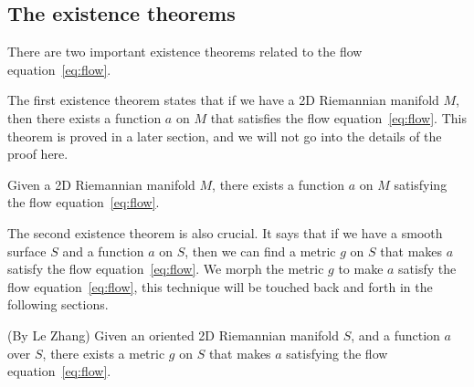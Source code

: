\subsection{The existence theorems}\label{subsec:existence-theorems}

There are two important existence theorems related to the flow equation~\eqref{eq:flow}.

The first existence theorem states that if we have a 2D Riemannian manifold $M$, then there exists a function $a$ on $M$ that satisfies the flow equation~\eqref{eq:flow}. This theorem is proved in a later section, and we will not go into the details of the proof here.

\begin{theorem}
    Given a 2D Riemannian manifold $M$, there exists a function $a$ on $M$ satisfying the flow equation~\eqref{eq:flow}.
    \label{prop:existence1st}
\end{theorem}

The second existence theorem is also crucial.
It says that if we have a smooth surface $S$ and a function $a$ on $S$, then we can find a metric $g$ on $S$ that makes $a$ satisfy the flow equation~\eqref{eq:flow}.
We morph the metric $g$ to make $a$ satisfy the flow equation~\eqref{eq:flow}, this technique will be touched back and forth in the following sections.

\begin{theorem}(By Le Zhang)
    Given an oriented 2D Riemannian manifold $S$, and a function $a$ over $S$, there exists a metric $g$ on $S$ that makes $a$
    satisfying the flow equation~\eqref{eq:flow}.
    \label{prop:existence2nd}
\end{theorem}

